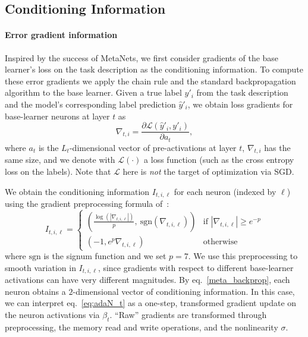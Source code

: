 \documentclass{article}
\begin{document}
\subsection{Conditioning Information}
\label{sec:info}
\paragraph{Error gradient information}
Inspired by the success of MetaNets, we first consider gradients of the base learner's loss on the task description as the conditioning information.
To compute these error gradients we apply the chain rule and the standard backpropagation algorithm to the base learner.
Given a true label $y'_i$ from the task description and the model's corresponding label prediction $\hat{y}'_i$, we obtain loss gradients for base-learner neurons at layer $t$ as 
\begin{equation}
\nabla_{t,i} = \frac{\partial \mathcal{L}(\hat{y}'_i, y'_i)}{\partial a_t},
\end{equation}
where $a_t$ is the $L_t$-dimensional vector of pre-activations at layer $t$, $\nabla_{t,i}$ has the same size, and we denote with $\mathcal{L}(\cdot)$ a loss function (such as the cross entropy loss on the labels). Note that $\mathcal{L}$ here is \emph{not} the target of optimization via SGD.

We obtain the conditioning information $I_{t,i,\ell}$ for each neuron (indexed by $\ell$) using the gradient preprocessing formula of~\citet{andrychowicz2016learning}:
\begin{equation}
\label{meta_backprop}
I_{t,i,\ell} =
\begin{cases}
  \left( \frac{\log(|\nabla_{t,i,\ell}|)}{p},~\text{sgn}(\nabla_{t,i,\ell})\right) & \text{if }|\nabla_{t,i,\ell}| \geq e^{-p}\\    
  (-1, e^p \nabla_{t,i,\ell}) & \text{otherwise}
\end{cases}
\end{equation}
where $\text{sgn}$ is the signum function and we set $p=7$.
We use this preprocessing to smooth variation in $I_{t,i,\ell}$, since gradients with respect to different base-learner activations can have very different magnitudes.
By eq.~\ref{meta_backprop}, each neuron obtains a $2$-dimensional vector of conditioning information. In this case, we can interpret eq.~\ref{eq:adaN_t} as a one-step, transformed gradient update on the neuron activations via $\beta_t$. ``Raw'' gradients are transformed through preprocessing, the memory read and write operations, and the nonlinearity $\sigma$.
\end{document}
